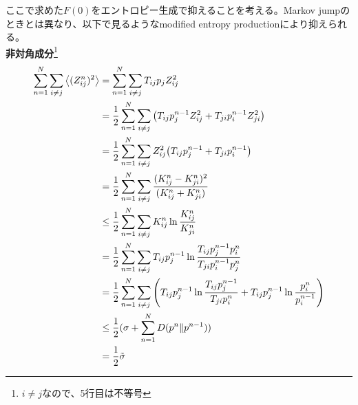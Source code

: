 \documentclass[a4paper,11pt]{jsarticle}
\numberwithin{equation}{section}
\begin{document}
ここで求めた$F(0)$をエントロピー生成で抑えることを考える。Markov jumpのときとは異なり、以下で見るようなmodified entropy productionにより抑えられる。\\
\textbf{非対角成分}\footnote{$i \neq j$なので、5行目は不等号}
\begin{align}
    \sum_{n=1}^{N} \sum_{i\neq j} \ev{(Z_{ij}^n)^2} &= \sum_{n=1}^{N}\sum_{i \neq j} T_{ij}p_{j}Z_{ij}^2 \\
    &=\frac{1}{2}\sum_{n=1}^{N} \sum_{i\neq j} \qty(T_{ij} p_j^{n-1} Z_{ij}^2 + T_{ji} p_i^{n-1} Z_{ji}^2)\\
    &= \frac{1}{2}\sum_{n=1}^{N} \sum_{i\neq j} Z_{ij}^2 \qty(T_{ij} p_j^{n-1} + T_{ji} p_i^{n-1})\\
    &=\frac{1}{2}\sum_{n=1}^{N} \sum_{i\neq j} \frac{(K_{ij}^n - K_{ji}^n)^2}{(K_{ij}^n + K_{ji}^n)} \\
    &\leq \frac{1}{2}\sum_{n=1}^{N} \sum_{i\neq j} K_{ij}^n \ln \frac{K_{ij}^n}{K_{ji}^n}\\
    &= \frac{1}{2}\sum_{n=1}^{N} \sum_{i\neq j} T_{ij} p_j^{n-1} \ln \frac{T_{ij} p_j^{n-1} p_i^{n}}{T_{ji} p_i^{n-1} p_j^{n}}\\
    &= \frac{1}{2}\sum_{n=1}^{N} \sum_{i\neq j} \qty(T_{ij} p_j^{n-1} \ln \frac{T_{ij} p_j^{n-1}}{T_{ji} p_i^{n}} + T_{ij} p_j^{n-1} \ln \frac{p_i^{n}}{p_i^{n-1}})\\
    &\leq \frac{1}{2}(\sigma + \sum_{n=1}^{N} D(p^n \| p^{n-1}))\\
    &= \frac{1}{2}\tilde{\sigma}
\end{align}
\end{document}

